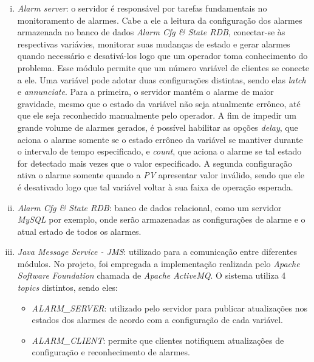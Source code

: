 \begin{enumerate}[i.]
  
  \item \textit{Alarm server}: o servidor é responsável por tarefas fundamentais
  no monitoramento de alarmes. Cabe a ele a leitura da configuração dos alarmes
  armazenada no banco de dados \textit{Alarm Cfg \& State RDB}, conectar-se às
  respectivas variávies, monitorar suas mudanças de estado e gerar alarmes
  quando necessário e desativá-los logo que um operador toma conhecimento
  do problema. Esse módulo permite que um número variável de clientes se conecte
  a ele. Uma variável pode adotar duas configurações distintas, sendo elas
  \textit{latch} e \textit{annunciate}. Para a primeira, o servidor mantém o
  alarme de maior gravidade, mesmo que o estado da variável não seja
  atualmente errôneo, até que ele seja reconhecido manualmente pelo operador.
  A fim de impedir um grande volume de alarmes gerados, é possível habilitar
  as opções \textit{delay}, que aciona o alarme somente se o estado errôneo da
  variável se mantiver durante o intervalo de tempo especificado, e
  \textit{count}, que aciona o alarme se tal estado for detectado mais vezes
  que o valor especificado. A segunda configuração ativa o alarme somente
  quando a \textit{PV} apresentar valor inválido, sendo que ele é desativado
  logo que tal variável voltar à sua faixa de operação esperada.
  
  \item \textit{Alarm Cfg \& State RDB}: banco de dados relacional, como um
  servidor \textit{MySQL} por exemplo, onde serão armazenadas as configurações
  de alarme e o atual estado de todos os alarmes.
  
  \item \textit{Java Message Service - JMS}: utilizado para a comunicação entre
  diferentes módulos. No projeto, foi empregada a implementação realizada pelo
  \textit{Apache Software Foundation} chamada de  \textit{Apache ActiveMQ}. O
  sistema utiliza 4 \textit{topics} distintos, sendo eles:
  
  \begin{itemize} \renewcommand\labelitemi{--}
    \item \textit{ALARM\_SERVER}: utilizado pelo servidor para publicar
    atualizações nos estados dos alarmes de acordo com a configuração de cada
    variável.
    
    \item \textit{ALARM\_CLIENT}: permite que clientes notifiquem atualizações
    de configuração e reconhecimento de alarmes.
    

\end{itemize}
\end{enumerate}
